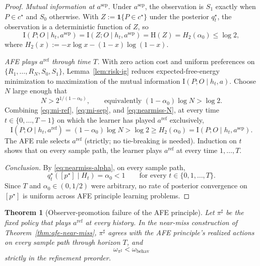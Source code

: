 \documentclass[11pt]{article}
\newtheorem{theorem}{Theorem}[section]
\theoremstyle{definition}
\theoremstyle{remark}
\newcommand{\I}{\mathrm{I}}
\newcommand{\Hh}{\mathrm{H}}
\newcommand{\one}{\mathbf{1}}
\begin{document}
\begin{proof}
\emph{Mutual information at $a^{\mathrm{sep}}$.} Under $a^{\mathrm{sep}}$, the observation is $S_1$ exactly when $P\in c^\star$ and $S_0$ otherwise. With $Z:=\one\{P\in c^\star\}$ under the posterior $q_t^\star$, the observation is a deterministic function of $Z$, so
\begin{equation}
\label{eq:mi-sep}
\I(P;O\mid h_t,a^{\mathrm{sep}})=\I(Z;O\mid h_t,a^{\mathrm{sep}})=\Hh(Z)=H_2(\alpha_0)\le\log 2,
\end{equation}
where $H_2(x):=-x\log x-(1-x)\log(1-x)$.

\emph{AFE plays $a^{\mathrm{ref}}$ through time $T$.} With zero action cost and uniform preferences on $\{R_1,\dots,R_N,S_0,S_1\}$, Lemma~\ref{lem:risk-ig} reduces expected-free-energy minimization to maximization of the mutual information $\I(P;O\mid h_t,a)$. Choose $N$ large enough that
\begin{equation}
\label{eq:nearmiss-N}
N>2^{1/(1-\alpha_0)},\qquad\text{equivalently }(1-\alpha_0)\log N>\log 2.
\end{equation}
Combining \eqref{eq:mi-ref}, \eqref{eq:mi-sep}, and \eqref{eq:nearmiss-N}, at every time $t\in\{0,\dots,T-1\}$ on which the learner has played $a^{\mathrm{ref}}$ exclusively,
\[
\I(P;O\mid h_t,a^{\mathrm{ref}})=(1-\alpha_0)\log N>\log 2\ge H_2(\alpha_0)=\I(P;O\mid h_t,a^{\mathrm{sep}}).
\]
The AFE rule selects $a^{\mathrm{ref}}$ (strictly; no tie-breaking is needed). Induction on $t$ shows that on every sample path, the learner plays $a^{\mathrm{ref}}$ at every time $1,\dots,T$.

\emph{Conclusion.} By \eqref{eq:nearmiss-alpha}, on every sample path,
\[
q_t^\star([p^\star]\mid H_t)=\alpha_0<1
\qquad\text{for every }t\in\{0,1,\dots,T\}.
\]
Since $T$ and $\alpha_0\in(0,1/2)$ were arbitrary, no rate of posterior convergence on $[p^\star]$ is uniform across AFE principle learning problems.
\end{proof}

\begin{theorem}[Observer-promotion failure of the AFE principle]
\label{thm:observer-promotion-failure}
Let $\pi^\sharp$ be the fixed policy that plays $a^{\mathrm{ref}}$ at every history. In the near-miss construction of Theorem~\ref{thm:afe-near-miss}, $\pi^\sharp$ agrees with the AFE principle's realized actions on every sample path through horizon $T$, and
\[
\omega_{\pi^\sharp}<\omega_{\mathrm{behav}}
\]
strictly in the refinement preorder.
\end{theorem}
\end{document}

